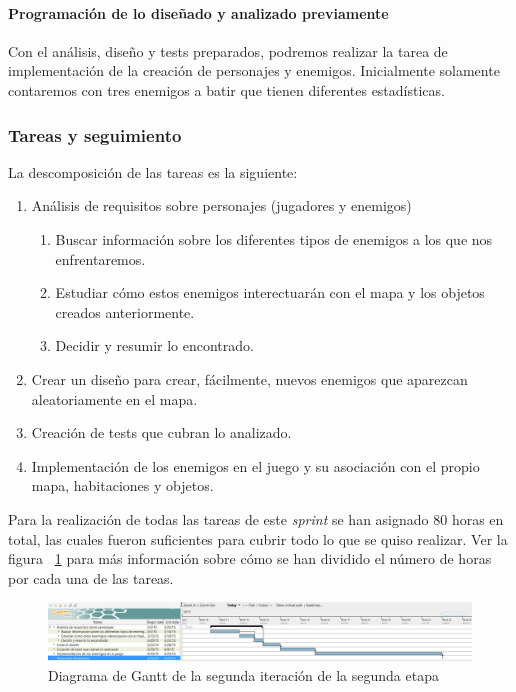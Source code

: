 \paragraph{Programación de lo diseñado y analizado previamente} Con el análisis, diseño y tests preparados, podremos realizar la tarea de implementación de la creación de personajes y enemigos. Inicialmente solamente contaremos con tres enemigos a batir que tienen diferentes estadísticas.

\subsubsection{Tareas y seguimiento}

La descomposición de las tareas es la siguiente:

\begin{enumerate}[label=\bfseries WBS 2.\arabic*]
  \item Análisis de requisitos sobre personajes (jugadores y enemigos)
    \begin{enumerate}[label=\bfseries WBS 2.1.\arabic*]
      \item Buscar información sobre los diferentes tipos de enemigos a los que nos enfrentaremos.
      \item Estudiar cómo estos enemigos interectuarán con el mapa y los objetos creados anteriormente.
      \item Decidir y resumir lo encontrado.
    \end{enumerate}
  \item Crear un diseño para crear, fácilmente, nuevos enemigos que aparezcan aleatoriamente en el mapa.
  \item Creación de tests que cubran lo analizado.
  \item Implementación de los enemigos en el juego y su asociación con el propio mapa, habitaciones y objetos.
\end{enumerate}

Para la realización de todas las tareas de este \textit{sprint} se han asignado 80 horas en total, las cuales fueron suficientes para cubrir todo lo que se quiso realizar. Ver la figura ~\ref{fig:sec2it2} para más información sobre cómo se han dividido el número de horas por cada una de las tareas.

\begin{figure}
    \includegraphics[width=\textwidth,height=\textheight,keepaspectratio]{./img/sec2it2.png}
  \caption{Diagrama de Gantt de la segunda iteración de la segunda etapa}
  \label{fig:sec2it2}
\end{figure}

